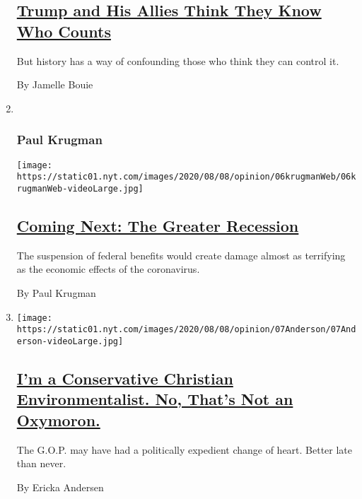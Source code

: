 \begin{enumerate}
  \hypertarget{trump-and-his-allies-think-they-know-who-counts}{%
  \subsection{\texorpdfstring{\href{/2020/08/07/opinion/trump-2020-census.html}{Trump
  and His Allies Think They Know Who
  Counts}}{Trump and His Allies Think They Know Who Counts}}\label{trump-and-his-allies-think-they-know-who-counts}}

  But history has a way of confounding those who think they can control
  it.

  By Jamelle Bouie
\item ~
  \hypertarget{paul-krugman}{%
  \subsubsection{Paul Krugman}\label{paul-krugman}}

  \texttt{[image: https://static01.nyt.com/images/2020/08/08/opinion/06krugmanWeb/06krugmanWeb-videoLarge.jpg]}

  \hypertarget{coming-next-the-greater-recession}{%
  \subsection{\texorpdfstring{\href{/2020/08/06/opinion/coronavirus-us-recession.html}{Coming
  Next: The Greater
  Recession}}{Coming Next: The Greater Recession}}\label{coming-next-the-greater-recession}}

  The suspension of federal benefits would create damage almost as
  terrifying as the economic effects of the coronavirus.

  By Paul Krugman
\item
  \texttt{[image: https://static01.nyt.com/images/2020/08/08/opinion/07Anderson/07Anderson-videoLarge.jpg]}

  \hypertarget{im-a-conservative-christian-environmentalist-no-thats-not-an-oxymoron}{%
  \subsection{\texorpdfstring{\href{/2020/08/07/opinion/republicans-climate-change.html}{I'm
  a Conservative Christian Environmentalist. No, That's Not an
  Oxymoron.}}{I'm a Conservative Christian Environmentalist. No, That's Not an Oxymoron.}}\label{im-a-conservative-christian-environmentalist-no-thats-not-an-oxymoron}}

  The G.O.P. may have had a politically expedient change of heart.
  Better late than never.

  By Ericka Andersen
\end{enumerate}

